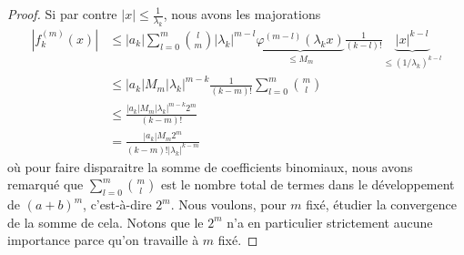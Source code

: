 \begin{proof}
	Si par contre \( | x |\leq\frac{1}{ \lambda_k }\), nous avons les majorations
	\begin{subequations}
		\begin{align}
			| f^{(m)}_k(x) | & \leq  |a_k|\sum_{l=0}^{m}\binom{ l }{ m }|\lambda_k|^{m-l}\underbrace{\varphi^{(m-l)}(\lambda_kx)}_{\leq M_m}\frac{ 1 }{ (k-l)! }\underbrace{| x |^{k-l}}_{\leq (1/\lambda_k)^{k-l}} \\
			                 & \leq | a_k |M_m| \lambda_k |^{m-k}\frac{1}{ (k-m)! }\sum_{l=0}^{m}\binom{ m }{ l }                                                                                                   \\
			                 & \leq \frac{ | a_k |M_m | \lambda_k |^{m-k}2^m }{ (k-m)! }                                                                                                                            \\
			                 & = \frac{ | a_k |M_m 2^m }{ (k-m)!  | \lambda_k |^{k-m} }       \label{EqQSPUaun}
		\end{align}
	\end{subequations}
	où pour faire disparaitre la somme de coefficients binomiaux, nous avons remarqué que \( \sum_{l=0}^m\binom{ m }{ l }\) est le nombre total de termes dans le développement de \( (a+b)^m\), c'est-à-dire \( 2^m\). Nous voulons, pour \( m\) fixé, étudier la convergence de la somme de cela. Notons que le \( 2^m\) n'a en particulier strictement aucune importance parce qu'on travaille à \( m\) fixé.


\end{proof}
